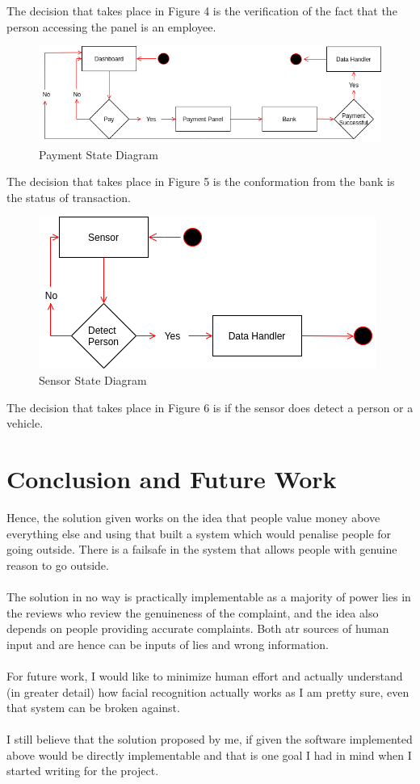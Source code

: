 \documentclass[10pt,twocolumn,letterpaper]{article}
\begin{document}
\noindent The decision that takes place in Figure 4 is the verification of the fact 
that the person accessing the panel is an employee.\\
\begin{figure}[h]
    \centering
    \includegraphics[scale=0.3]{img/State Diagram3.png}    
    \caption{Payment State Diagram}
\end{figure}

\noindent The decision that takes place in Figure 5 is the conformation from the 
bank is the status of transaction.\\ 
\begin{figure}[h]
    \centering
    \includegraphics[scale=0.3]{img/State Diagram4.png}    
    \caption{Sensor State Diagram}
\end{figure}

\noindent The decision that takes place in Figure 6 is if the sensor does detect 
a person or a vehicle.
\section*{Conclusion and Future Work}
Hence, the solution given works on the idea that people value money above everything 
else and using that built a system which would penalise people for going outside. There 
is a failsafe in the system that allows people with genuine reason to go outside.
\\\\
The solution in no way is practically implementable as a majority of power lies in the 
reviews who review the genuineness of the complaint, and the idea also depends on people 
providing accurate complaints. Both atr sources of human input and are hence can be 
inputs of lies and wrong information.
\\\\
For future work, I would like to minimize human effort and actually understand (in greater 
detail) how facial recognition actually works as I am pretty sure, even that system can 
be broken against.
\\\\
I still believe that the solution proposed by me, if given the software implemented 
above would be directly implementable and that is one goal I had in mind when I started 
writing for the project.
\end{document}
